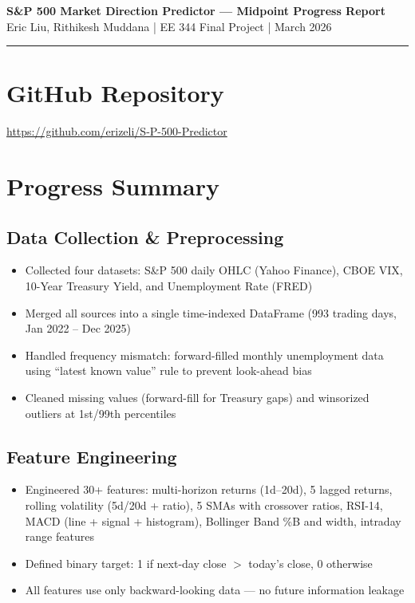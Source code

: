 \documentclass[11pt]{article}
\begin{document}
\begin{center}
    {\Large \textbf{S\&P 500 Market Direction Predictor --- Midpoint Progress Report}} \\[6pt]
    {\normalsize Eric Liu, Rithikesh Muddana \quad | \quad EE 344 Final Project \quad | \quad March 2026}
\end{center}

\vspace{4pt}
\hrule
\vspace{8pt}

\section*{GitHub Repository}

\url{https://github.com/erizeli/S-P-500-Predictor}

\section*{Progress Summary}

\subsection*{Data Collection \& Preprocessing}
\begin{itemize}[nosep, leftmargin=1.2em]
    \item Collected four datasets: S\&P 500 daily OHLC (Yahoo Finance), CBOE VIX, 10-Year Treasury Yield, and Unemployment Rate (FRED)
    \item Merged all sources into a single time-indexed DataFrame (993 trading days, Jan 2022 -- Dec 2025)
    \item Handled frequency mismatch: forward-filled monthly unemployment data using ``latest known value'' rule to prevent look-ahead bias
    \item Cleaned missing values (forward-fill for Treasury gaps) and winsorized outliers at 1st/99th percentiles
\end{itemize}

\subsection*{Feature Engineering}
\begin{itemize}[nosep, leftmargin=1.2em]
    \item Engineered 30+ features: multi-horizon returns (1d--20d), 5 lagged returns, rolling volatility (5d/20d + ratio), 5 SMAs with crossover ratios, RSI-14, MACD (line + signal + histogram), Bollinger Band \%B and width, intraday range features
    \item Defined binary target: 1 if next-day close $>$ today's close, 0 otherwise
    \item All features use only backward-looking data --- no future information leakage
\end{itemize}
\end{document}
